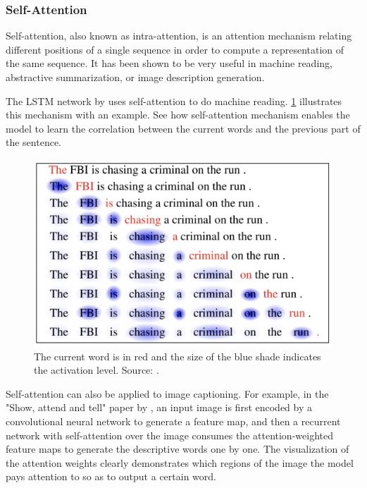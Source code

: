 \subsubsection{Self-Attention}

Self-attention, also known as intra-attention, is an attention mechanism relating different positions of a single sequence in order to compute a representation of the same sequence. It has been shown to be very useful in machine reading, abstractive summarization, or image description generation.

The LSTM network by \citet{Cheng2016} uses self-attention to do machine reading. \cref{fig:self-attention} illustrates this mechanism with an example. See how self-attention mechanism enables the model to learn the correlation between the current words and the previous part of the sentence.

\begin{figure}[hpt]
	\centering
	\includegraphics[scale=0.2]{images/ch3/self-attention.png}
	\caption{The current word is in red and the size of the blue shade indicates the activation level. Source: \citep{Cheng2016}.}
	\label{fig:self-attention}
\end{figure}

Self-attention can also be applied to image captioning. For example, in the "Show, attend and tell" paper by \citet{Xu2015}, an input  image is first encoded by a convolutional neural network to generate a feature map, and then a recurrent network with self-attention over the image consumes the attention-weighted feature maps to generate the descriptive words one by one. The visualization of the attention weights clearly demonstrates which regions of the image the model pays attention to so as to output a certain word.

